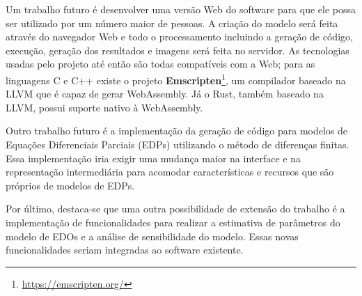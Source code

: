 \documentclass[
	12pt,				%
	openright,			%
	oneside,			%
	a4paper,			%
	main=brazil,
	english,			%
	]{ufsj-abntex2}
\begin{document}
Um trabalho futuro é desenvolver uma versão Web do software para que ele possa ser utilizado por um número maior de pessoas. A criação do modelo será feita através do navegador Web e todo o processamento incluindo a geração de código, execução, geração dos resultados e imagens será feita no servidor. As tecnologias usadas pelo projeto até então são todas compatíveis com a Web; para as linguagens C e C++ existe o projeto \textbf{Emscripten}\footnote{\href{https://emscripten.org/}{https://emscripten.org/}}, um compilador baseado na LLVM que é capaz de gerar WebAssembly. Já o Rust, também baseado na LLVM, possui suporte nativo à WebAssembly.

Outro trabalho futuro é a implementação da geração de código para modelos de Equações Diferenciais Parciais (EDPs) utilizando o método de diferenças finitas. Essa implementação iria exigir uma mudança maior na interface e na representação intermediária para acomodar características e recursos que são próprios de modelos de EDPs. 

Por último, destaca-se que uma outra possibilidade de extensão do trabalho é a implementação de funcionalidades para realizar a estimativa de parâmetros do modelo de EDOs e a análise de sensibilidade do modelo. Essas novas funcionalidades seriam integradas ao software existente.  




\postextual



\end{document}
